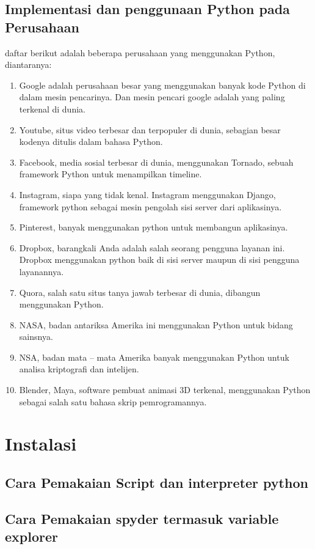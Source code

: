 \documentclass{article}
\begin{document}
\subsection{Implementasi dan penggunaan Python pada Perusahaan}
daftar berikut adalah beberapa perusahaan yang menggunakan Python, diantaranya:
\begin{enumerate}
\item
Google adalah perusahaan besar yang menggunakan banyak kode Python di dalam mesin pencarinya. Dan mesin pencari google adalah yang paling terkenal di dunia.
\item
Youtube, situs video terbesar dan terpopuler di dunia, sebagian besar kodenya ditulis dalam bahasa Python.
\item
Facebook, media sosial terbesar di dunia, menggunakan Tornado, sebuah framework Python untuk menampilkan timeline.
\item
Instagram, siapa yang tidak kenal. Instagram menggunakan Django, framework python sebagai mesin pengolah sisi server dari aplikasinya.
\item
Pinterest, banyak menggunakan python untuk membangun aplikasinya.
\item
Dropbox, barangkali Anda adalah salah seorang pengguna layanan ini. Dropbox menggunakan python baik di sisi server maupun di sisi pengguna layanannya.
\item
Quora, salah satu situs tanya jawab terbesar di dunia, dibangun menggunakan Python.
\item
NASA, badan antariksa Amerika ini menggunakan Python untuk bidang sainsnya.
\item
NSA, badan mata – mata Amerika banyak menggunakan Python untuk analisa kriptografi dan intelijen.
\item
Blender, Maya, software pembuat animasi 3D terkenal, menggunakan Python sebagai salah satu bahasa skrip pemrogramannya.

\end{enumerate}


\section{Instalasi}
\subsection{Cara Pemakaian Script dan interpreter python}
\subsection{Cara Pemakaian spyder termasuk variable explorer}
\end{document}
